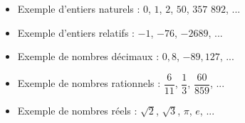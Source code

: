 \documentclass[classe=$2^{de}$]{coursclass}
\begin{document}
\begin{exemple}
	\begin{itemize}
		\item Exemple d'entiers naturels : $0$, $1$, $2$, $50$, $357$ $892$, ...
		\item Exemple d'entiers relatifs : $-1$, $-76$, $-2689$, ...
		\item Exemple de nombres décimaux : $0,8$, $-89,127$, ...
		\item Exemple de nombres rationnels : $\dfrac{6}{11}$, $\dfrac{1}{3}$, $\dfrac{60}{859}$, ...
		\item Exemple de nombres réels : $\sqrt{2}$, $\sqrt{3}$, $π$, $e$, ...
	\end{itemize}
\end{exemple}
\end{document}
